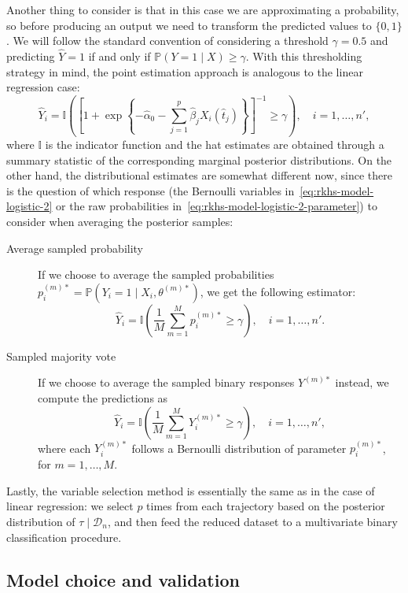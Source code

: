 \documentclass[ba]{imsart}
\numberwithin{equation}{section}
\theoremstyle{plain}
\begin{document}
Another thing to consider is that in this case we are approximating a probability, so before producing an output we need to transform the predicted values to \(\{0, 1\}\). We will follow the standard convention of considering a threshold \(\gamma = 0.5\) and predicting \(\hat Y=1\) if and only if \(\mathbb P(Y=1\mid X) \geq \gamma\). With this thresholding strategy in mind, the point estimation approach is analogous to the linear regression case:
\[
\hat Y_i = \mathbb I \left( \left[\displaystyle 1 + \exp\left\{-\hat\alpha_0 - \sum_{j=1}^p \hat\beta_j X_i(\hat t_j)\right\}\right]^{-1} \geq \gamma \right), \quad i=1,\dots,n',
\]
where \(\mathbb I\) is the indicator function and the hat estimates are obtained through a summary statistic of the corresponding marginal posterior distributions. On the other hand, the distributional estimates are somewhat different now, since there is the question of which response (the Bernoulli variables in~\eqref{eq:rkhs-model-logistic-2} or the raw probabilities in~\eqref{eq:rkhs-model-logistic-2-parameter}) to consider when averaging the posterior samples:
\begin{description}
  \item[Average sampled probability] If we choose to average the sampled probabilities \(p_i^{(m)*} = \mathbb P(Y_i =1 \mid X_i,\theta^{(m)*})\), we get the following estimator:
  \[
    \hat Y_i = \mathbb I\left(\frac{1}{M} \sum_{m=1}^M p_i^{(m)*} \geq \gamma\right), \quad i=1,\dots,n'.
  \]
  \item[Sampled majority vote] If we choose to average the sampled binary responses \(Y^{(m)*}\) instead, we compute the predictions as
\[
  \hat Y_i = \mathbb I\left(\frac{1}{M} \sum_{m=1}^M Y_i^{(m)*} \geq \gamma\right), \quad i=1,\dots,n',
\]
where each \(Y_i^{(m)*}\) follows a Bernoulli distribution of parameter \(p_i^{(m)*}\), for \(m=1,\dots,M\).
\end{description}
Lastly, the variable selection method is essentially the same as in the case of linear regression: we select \(p\) times from each trajectory based on the posterior distribution of \(\tau\mid \mathcal D_n\), and then feed the reduced dataset to a multivariate binary classification procedure.

\subsection{Model choice and validation}\label{sec:model-choice}
\end{document}
